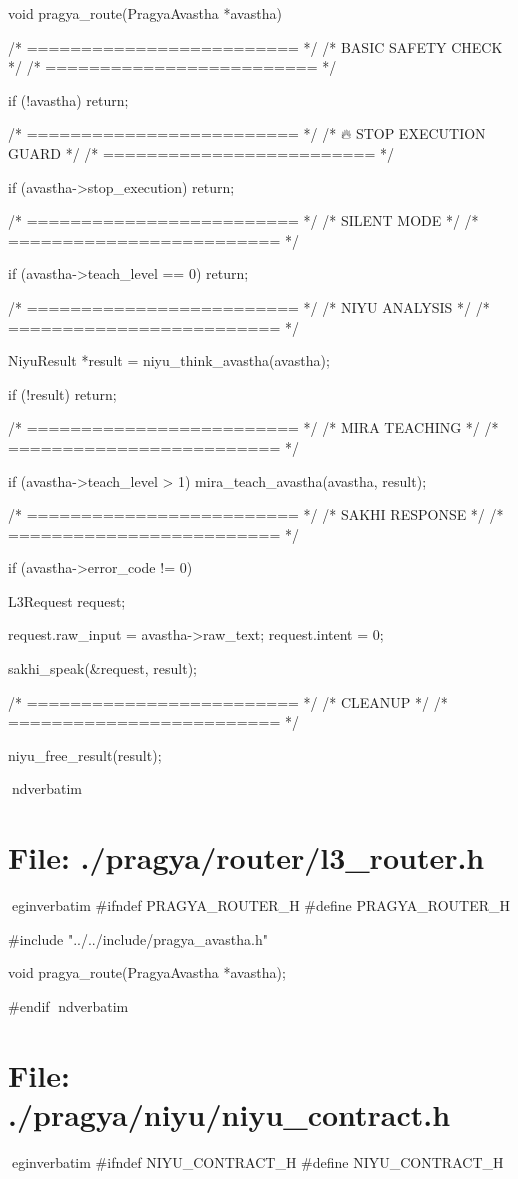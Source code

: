 \documentclass{article}
\begin{document}
void pragya_route(PragyaAvastha *avastha)
{
    /* ========================= */
    /* BASIC SAFETY CHECK        */
    /* ========================= */

    if (!avastha)
        return;

    /* ========================= */
    /* 🔥 STOP EXECUTION GUARD   */
    /* ========================= */

    if (avastha->stop_execution)
        return;

    /* ========================= */
    /* SILENT MODE               */
    /* ========================= */

    if (avastha->teach_level == 0)
        return;

    /* ========================= */
    /* NIYU ANALYSIS             */
    /* ========================= */

    NiyuResult *result = niyu_think_avastha(avastha);

    if (!result)
        return;

    /* ========================= */
    /* MIRA TEACHING             */
    /* ========================= */

    if (avastha->teach_level > 1)
    {
        mira_teach_avastha(avastha, result);
    }

    /* ========================= */
    /* SAKHI RESPONSE            */
    /* ========================= */

    if (avastha->error_code != 0)
    {
        L3Request request;

        request.raw_input = avastha->raw_text;
        request.intent = 0;

        sakhi_speak(&request, result);
    }

    /* ========================= */
    /* CLEANUP                   */
    /* ========================= */

    niyu_free_result(result);
}
nd{verbatim}
\section*{File: ./pragya/router/l3_router.h}
egin{verbatim}
#ifndef PRAGYA_ROUTER_H
#define PRAGYA_ROUTER_H

#include "../../include/pragya_avastha.h"

void pragya_route(PragyaAvastha *avastha);

#endif
nd{verbatim}
\section*{File: ./pragya/niyu/niyu_contract.h}
egin{verbatim}
#ifndef NIYU_CONTRACT_H
#define NIYU_CONTRACT_H
\end{document}

